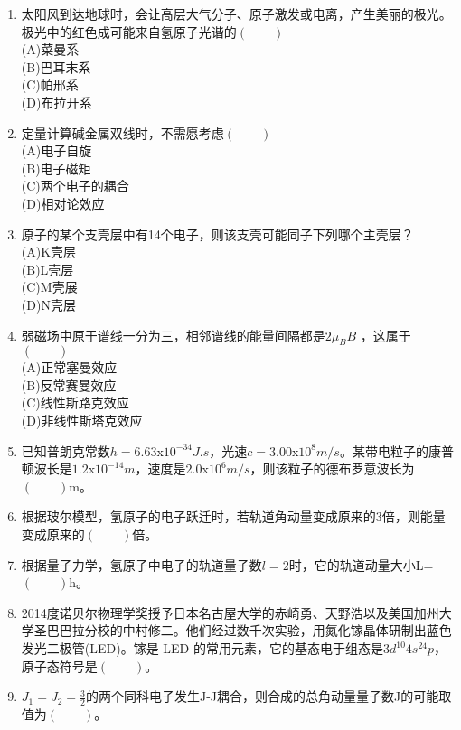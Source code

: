 \begin{enumerate}
(A)强度\\
(B)波长\\
(C)偏振方向\\
(D)照射时间
\item 太阳风到达地球时，会让高层大气分子、原子激发或电离，产生美丽的极光。极光中的红色成可能来自氢原子光谐的$(\qquad)$\\
(A)菜曼系\\
(B)巴耳末系\\
(C)帕邢系\\
(D)布拉开系
\item 定量计算碱金属双线时，不需愿考虑$(\qquad)$\\
(A)电子自旋\\
(B)电子磁矩\\
(C)两个电子的耦合\\
(D)相对论效应
\item 原子的某个支壳层中有14个电子，则该支壳可能同子下列哪个主壳层？\\
(A)K壳层\\
(B)L壳层\\
(C)M壳展\\
(D)N壳层
\item 弱磁场中原于谱线一分为三，相邻谱线的能量间隔都是$2\mu_B B$ ，这属于$(\qquad)$\\
(A)正常塞曼效应\\
(B)反常赛曼效应 \\
(C)线性斯路克效应 \\
(D)非线性斯塔克效应
\item 已知普朗克常数$h=6.63$x$10^{-34}J.s$，光速$c=3.00$x$10^8 m/s$。某带电粒子的康普顿波长是$1.2$x$10^{-14}m$，速度是$2.0$x$10^6 m/s$，则该粒子的德布罗意波长为$(\qquad)$m。
\item 根据玻尔模型，氢原子的电子跃迁时，若轨道角动量变成原来的3倍，则能量变成原来的$(\qquad)$倍。
\item 根据量子力学，氢原子中电子的轨道量子数$l=2$时，它的轨道动量大小L=$(\qquad)$h。
\item 2014度诺贝尔物理学奖授予日本名古屋大学的赤崎勇、天野浩以及美国加州大学圣巴巴拉分校的中村修二。他们经过数千次实验，用氮化镓晶体研制出蓝色发光二极管(LED)。镓是 LED 的常用元素，它的基态电于组态是$3d^{10}4s^24p$，原子态符号是$(\qquad)$。
\item $J_1=J_2=\frac{3}{2}$的两个同科电子发生J-J耦合，则合成的总角动量量子数J的可能取值为$(\qquad)$。
\end{enumerate}
